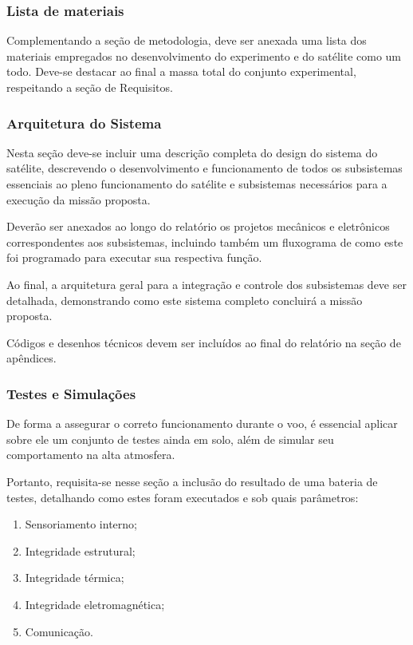         \subsubsection{Lista de materiais}
            Complementando a seção de metodologia, deve ser anexada uma lista dos materiais empregados no desenvolvimento do experimento e do satélite como um todo. Deve-se destacar ao final a massa total do conjunto experimental, respeitando a seção de Requisitos.
        
        \subsubsection{Arquitetura do Sistema}
            Nesta seção deve-se incluir uma descrição completa do design do sistema do satélite, descrevendo o desenvolvimento e funcionamento de todos os subsistemas essenciais ao pleno funcionamento do satélite e subsistemas necessários para a execução da missão proposta.

            Deverão ser anexados ao longo do relatório os projetos mecânicos e eletrônicos correspondentes aos subsistemas, incluindo também um fluxograma de como este foi programado para executar sua respectiva função.
            
            Ao final, a arquitetura geral para a integração e controle dos subsistemas deve ser detalhada, demonstrando como este sistema completo concluirá a missão proposta.

            Códigos e desenhos técnicos devem ser incluídos ao final do relatório na seção de apêndices.
        
        \subsubsection{Testes e Simulações}
            De forma a assegurar o correto funcionamento durante o voo, é essencial aplicar sobre ele um conjunto de testes ainda em solo, além de simular seu comportamento na alta atmosfera.

            Portanto, requisita-se nesse seção a inclusão do resultado de uma bateria de testes, detalhando como estes foram executados e sob quais parâmetros:
            \begin{enumerate}
                \item Sensoriamento interno;
                \item Integridade estrutural;
                \item Integridade térmica;
                \item Integridade eletromagnética;
                \item Comunicação.
            \end{enumerate}

